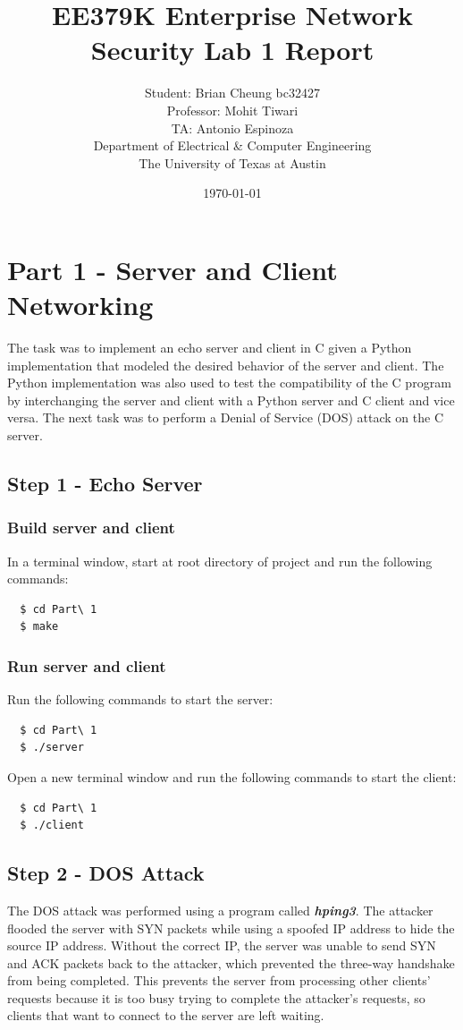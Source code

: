 \documentclass[11pt]{article}
\author{Student: Brian Cheung bc32427 \\ Professor: Mohit Tiwari \\ TA: Antonio Espinoza \\ Department of Electrical \& Computer Engineering \\ The University of Texas at Austin}
\date{\today}
\title{EE379K Enterprise Network Security Lab 1 Report}
\begin{document}
\maketitle
\section{Part 1 - Server and Client Networking}
\label{sec:part-1}
The task was to implement an echo server and client in C given a Python implementation that modeled the desired behavior of the server and client.
The Python implementation was also used to test the compatibility of the C program by interchanging the server and client with a Python server and C client and vice versa.
The next task was to perform a Denial of Service (DOS) attack on the C server.
\subsection{Step 1 - Echo Server}
\subsubsection{Build server and client}
In a terminal window, start at root directory of project and run the following commands:
\begin{verbatim}
  $ cd Part\ 1
  $ make
\end{verbatim}
\subsubsection{Run server and client}
Run the following commands to start the server:
\begin{verbatim}
  $ cd Part\ 1
  $ ./server
\end{verbatim}
Open a new terminal window and run the following commands to start the client:
\begin{verbatim}
  $ cd Part\ 1
  $ ./client
\end{verbatim}
\subsection{Step 2 - DOS Attack}
The DOS attack was performed using a program called \textbf{\emph{hping3}}.
The attacker flooded the server with SYN packets while using a spoofed IP address to hide the source IP address.
Without the correct IP, the server was unable to send SYN and ACK packets back to the attacker,
which prevented the three-way handshake from being completed.
This prevents the server from processing other clients' requests because it is too busy trying to complete the attacker's requests,
so clients that want to connect to the server are left waiting.
\end{document}
